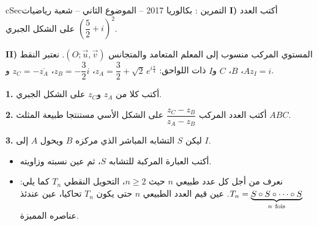 \documentclass[12pt,a4paper]{article}
\newenvironment{BOX}[2]{\begin{otherlanguage}{english}\begin{arbox}{#1}{#2}}{\end{arbox}\end{otherlanguage}}
\newcounter{exo}
\newenvironment{tamrin}[1]{\stepcounter{exo}\begin{BOX}{cSec}{التمرين \theexo: #1}}{\end{BOX}}
\renewcommand{\cdots}{\mathinner{\cdotp\cdotp\cdotp}}
\newenvironment{sq}{\begin{itemize}[leftmargin=2.4em,itemsep=3pt]}{\end{itemize}}
\newcommand{\qa}{\item[(أ)]}\newcommand{\qb}{\item[(ب)]}\newcommand{\qc}{\item[(جـ)]}\newcommand{\qd}{\item[(د)]}\newcommand{\qe}{\item[(هـ)]}
\newcommand{\QQ}[1]{\par\smallskip\textbf{#1.} }
\begin{document}
\begin{tamrin}{بكالوريا 2017 -- الموضوع الثاني -- شعبة رياضيات}
\textbf{I)} أكتب العدد $\left(\dfrac52+i\right)^2$ على الشكل الجبري.

\textbf{II)} المستوي المركب منسوب إلى المعلم المتعامد والمتجانس $\left(O;\vec u,\vec v\right)$.
نعتبر النقط $A$، $B$، $C$ و$I$ ذات اللواحق: $z_A=\dfrac32+\sqrt2\,e^{i\frac{\pi}{4}}$، $z_B=-\dfrac32i$، $z_C=-\overline{z_A}$ و$z_I=i$.

\QQ{1} أكتب كلا من $z_A$ و$z_C$ على الشكل الجبري.

\QQ{2} أكتب العدد المركب $\dfrac{z_C-z_B}{z_A-z_B}$ على الشكل الأسي مستنتجا طبيعة المثلث $ABC$.

\QQ{3} ليكن $S$ التشابه المباشر الذي مركزه $B$ ويحول $A$ إلى $I$.
\begin{sq}
\qa أكتب العبارة المركبة للتشابه $S$، ثم عين نسبته وزاويته.
\qb نعرف من أجل كل عدد طبيعي $n$ حيث $n\geq2$، التحويل النقطي $T_n$ كما يلي: $T_n=\underbrace{S\circ S\circ\cdots\circ S}_{n\ \text{fois}}$.
عين قيم العدد الطبيعي $n$ حتى يكون $T_n$ تحاكيا، عين عندئذ عناصره المميزة.
\end{sq}
\end{tamrin}
\end{document}
